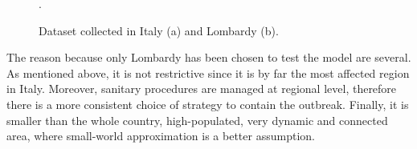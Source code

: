 \begin{figure}[!ht]\centering
{}

\caption{Dataset collected in Italy (a) and Lombardy (b).}.
\end{figure}

The reason because only Lombardy has been chosen to test the model are several. As mentioned above, it is not restrictive since it is by far the most affected region in Italy. Moreover, sanitary procedures are managed at regional level, therefore there is a more consistent choice of strategy to contain the outbreak. Finally, it is smaller than the whole country, high-populated, very dynamic and connected area, where small-world approximation is a better assumption.